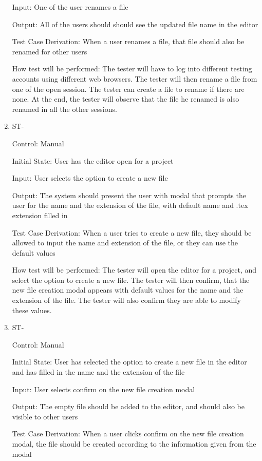 \documentclass[12pt, titlepage]{article}
\newcounter{TESTID}
\newcommand\TESTNUM{\stepcounter{TESTID}\theTESTID}
\begin{document}
\begin{enumerate}
		Input: One of the user renames a file
		
		Output: All of the users should should see the updated file name in the editor
		
		Test Case Derivation: When a user renames a file, that file should also be renamed for other users
		
		How test will be performed: The tester will have to log into different testing accounts using different web browsers. The tester will then rename a file from one of the open session. The tester can create a file to rename if there are none. At the end, the tester will observe that the file he renamed is also renamed in all the other sessions.
		
		\item{ST-\TESTNUM\\}
		
		Control: Manual
		
		Initial State: User has the editor open for a project
		
		Input: User selects the option to create a new file
		
		Output: The system should present the user with modal that prompts the user for the name and the extension of the file, with default name and .tex extension filled in
		
		Test Case Derivation: When a user tries to create a new file, they should be allowed to input the name and extension of the file, or they can use the default values
		
		How test will be performed: The tester will open the editor for a project, and select the option to create a new file. The tester will then confirm, that the new file creation modal appears with default values for the name and the extension of the file. The tester will also confirm they are able to modify these values.
		
		\item{ST-\TESTNUM\\}
		
		Control: Manual
		
		Initial State: User has selected the option to create a new file in the editor and has filled in the name and the extension of the file
		
		Input: User selects confirm on the new file creation modal
		
		Output: The empty file should be added to the editor, and should also be visible to other users
		
		Test Case Derivation: When a user clicks confirm on the new file creation modal, the file should be created according to the information given from the modal
		

\end{enumerate}
\end{document}
